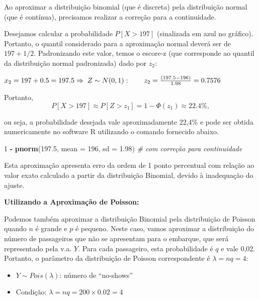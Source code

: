 \documentclass[
]{book}
\newenvironment{Shaded}{\begin{snugshade}}{\end{snugshade}}
\newcommand{\CommentTok}[1]{\textcolor[rgb]{0.56,0.35,0.01}{\textit{#1}}}
\newcommand{\DataTypeTok}[1]{\textcolor[rgb]{0.13,0.29,0.53}{#1}}
\newcommand{\DecValTok}[1]{\textcolor[rgb]{0.00,0.00,0.81}{#1}}
\newcommand{\FloatTok}[1]{\textcolor[rgb]{0.00,0.00,0.81}{#1}}
\newcommand{\KeywordTok}[1]{\textcolor[rgb]{0.13,0.29,0.53}{\textbf{#1}}}
\newcommand{\NormalTok}[1]{#1}
\newcommand{\OperatorTok}[1]{\textcolor[rgb]{0.81,0.36,0.00}{\textbf{#1}}}
\newcommand{\StringTok}[1]{\textcolor[rgb]{0.31,0.60,0.02}{#1}}
\providecommand{\tightlist}{%
  \setlength{\itemsep}{0pt}\setlength{\parskip}{0pt}}
\theoremstyle{definition}
\theoremstyle{definition}
\theoremstyle{definition}
\theoremstyle{remark}
\begin{document}
Ao aproximar a distribuição binomial (que é discreta) pela distribuição normal (que é contínua), precisamos realizar a correção para a continuidade.

Desejamos calcular a probabilidade \(P[X > 197]\) (sinalizada em azul no gráfico). Portanto, o quantil considerado para a aproximação normal deverá ser de \(197 + 1/2\). Padronizando este valor, temos o escore-z (que corresponde ao quantil da distribuição normal padronizada) dado por \(z_2\):

\(x_2 = 197 + 0.5 = 197.5 \\ \Rightarrow \; Z \sim N(0, 1): \qquad z_2 = \frac{(197.5 - 196)}{1.98} = 0.7576\)

Portanto,\\
\[P[X > 197] \approx P[Z > z_1] = 1 - \Phi(z_1)  \approx 22.4\%,\]

ou seja, a probabilidade desejada vale aproximadamente 22,4\% e pode ser obtida numericamente no software R utilizando o comando fornecido abaixo.

\begin{Shaded}
\begin{Highlighting}[]
\DecValTok{1} \OperatorTok{-}\StringTok{ }\KeywordTok{pnorm}\NormalTok{(}\FloatTok{197.5}\NormalTok{, }\DataTypeTok{mean =} \DecValTok{196}\NormalTok{, }\DataTypeTok{sd =} \FloatTok{1.98}\NormalTok{)  }\CommentTok{# com correção para continuidade}
\end{Highlighting}
\end{Shaded}

Esta aproximação apresenta erro da ordem de 1 ponto percentual com relação ao valor exato calculado a partir da distribuição Binomial, devido à inadequação do ajuste.

\textbf{Utilizando a Aproximação de Poisson:}

Podemos também aproximar a distribuição Binomial pela distribuição de Poisson quando \(n\) é grande e \(p\) é pequeno. Neste caso, vamos aproximar a distribuição do número de passageiros que não se apresentam para o embarque, que será representado pela v.a. \(Y\). Para cada passageiro, esta probabilidade é \(q\) e vale 0,02. Portanto, o parâmetro da distribuição de Poisson correspondente é \(\lambda = nq = 4\):

\begin{itemize}
\tightlist
\item
  \(Y \sim Pois(\lambda)\): número de ``no-shows''
\item
  Condição: \(\lambda = nq = 200 \times 0.02 = 4\)
\end{itemize}
\end{document}
